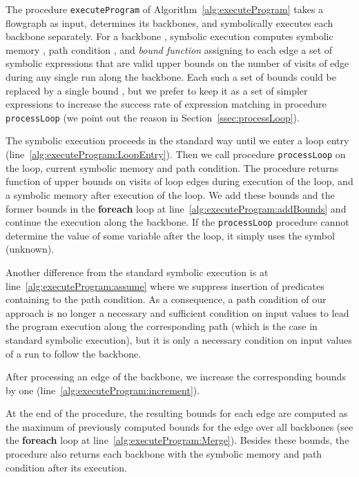 \documentclass[10pt,a4paper]{article}
\begin{document}
The procedure \texttt{executeProgram} of Algorithm~\ref{alg:executeProgram}
takes a flowgraph as input, determines its backbones, and symbolically
executes each backbone separately. For a backbone , symbolic
execution computes symbolic memory , path condition ,
and \emph{bound function}  assigning to each edge  a set of
symbolic expressions that are valid upper bounds on the number of visits of
edge  during any single run along the backbone. Each such a set
 of bounds could be replaced by a single bound
, but we prefer to keep it as a set of simpler
expressions to increase the success rate of expression matching in procedure
\texttt{processLoop} (we point out the reason in
Section~\ref{ssec:processLoop}).

The symbolic execution proceeds in the standard way until we enter a loop
entry (line~\ref{alg:executeProgram:LoopEntry}). Then we call procedure
\texttt{processLoop} on the loop, current symbolic memory and path
condition. The procedure returns function  of upper
bounds on visits of loop edges during execution of the loop, and a symbolic
memory after execution of the loop. We add these bounds and the former
bounds in the \textbf{foreach} loop at
line~\ref{alg:executeProgram:addBounds} and continue the execution along the
backbone.  If the \texttt{processLoop} procedure cannot determine the value
of some variable after the loop,
it simply uses the symbol  (unknown). 

Another difference from the standard symbolic execution is at
line~\ref{alg:executeProgram:assume} where we suppress insertion of
predicates containing  to the path condition. As a consequence, a
path condition of our approach is no longer a necessary and sufficient
condition on input values to lead the program execution along the
corresponding path (which is the case in standard symbolic execution), but
it is only a necessary condition on input values of a run to follow the
backbone.



After processing an edge of the backbone, we increase the corresponding
bounds by one (line~\ref{alg:executeProgram:increment}).

At the end of the procedure, the resulting bounds for each edge are computed
as the maximum of previously computed bounds for the edge over all backbones
(see the \textbf{foreach} loop at
line~\ref{alg:executeProgram:Merge}). Besides these bounds, the procedure
also returns each backbone with the symbolic memory and path condition after
its execution.
 
\end{document}
